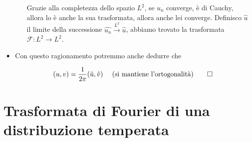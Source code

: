 \documentclass[10pt,a4paper,twoside]{book}
\begin{document}
\begin{itemize}
\begin{itemize}
Grazie alla completezza dello spazio $L^{2}$, se $u_{n}$ converge, è di Cauchy, allora lo è anche la sua trasformata, allora anche lei converge. Definisco $\hat{u}$ il limite della successione $\widehat{u_{n}}\xrightarrow{L^{2}}\hat{u}$, abbiamo trovato la trasformata $\mathcal{F} :L^{2}\rightarrow L^{2}$.
\end{itemize}
\item Con questo ragionamento potremmo anche dedurre che

\begin{equation*}
( u,v) =\frac{1}{2\pi }(\hat{u} ,\hat{v}) \ \ \ \ \text{(si mantiene l'ortogonalità)}\qed 
\end{equation*}
\end{itemize}
\section{Trasformata di Fourier di una distribuzione temperata}
\end{document}
